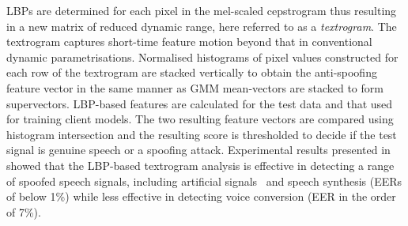 LBPs are determined for each pixel in the mel-scaled cepstrogram thus resulting in a new matrix of reduced dynamic range, here referred to as a \emph{textrogram}.  
The textrogram captures short-time feature motion beyond that in conventional dynamic parametrisations.  
Normalised histograms of pixel values constructed for each row of the textrogram   are stacked vertically to obtain the anti-spoofing feature vector in the same manner as GMM mean-vectors are stacked to form supervectors.  
LBP-based features are calculated for the test data and that used for training client models. The two resulting feature vectors are compared using histogram intersection and the resulting score is thresholded to decide if the test signal is genuine speech or a spoofing attack.
Experimental results presented in~\cite{Alegre2013a} showed that the LBP-based textrogram analysis is effective in detecting a range of spoofed speech signals, including artificial signals~\cite{Alegre2012a,Alegre2012b} and speech synthesis (EERs of below 1\%) while less effective in detecting voice conversion (EER in the order of 7\%).




